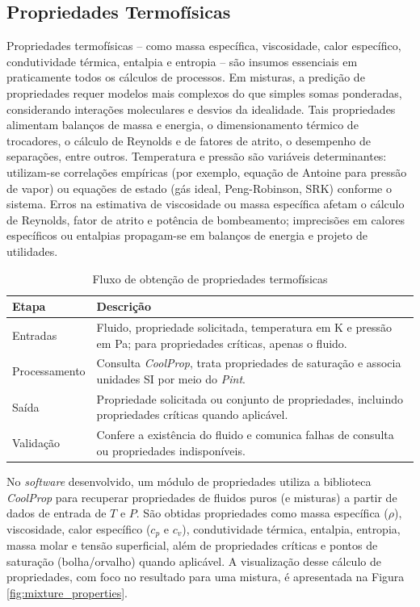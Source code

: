 \subsection{Propriedades Termofísicas}

Propriedades termofísicas – como massa específica, viscosidade, calor específico, condutividade térmica, entalpia e entropia – são insumos essenciais em praticamente todos os cálculos de processos. Em misturas, a predição de propriedades requer modelos mais complexos do que simples somas ponderadas, considerando interações moleculares e desvios da idealidade. Tais propriedades alimentam balanços de massa e energia, o dimensionamento térmico de trocadores, o cálculo de Reynolds e de fatores de atrito, o desempenho de separações, entre outros. Temperatura e pressão são variáveis determinantes: utilizam-se correlações empíricas (por exemplo, equação de Antoine para pressão de vapor) ou equações de estado (gás ideal, Peng-Robinson, SRK) conforme o sistema. Erros na estimativa de viscosidade ou massa específica afetam o cálculo de Reynolds, fator de atrito e potência de bombeamento; imprecisões em calores específicos ou entalpias propagam-se em balanços de energia e projeto de utilidades.

\begin{table}[H]
    \centering
    \caption{Fluxo de obtenção de propriedades termofísicas}
    \label{tab:fluxo-propriedades-termofisicas}
    \small
    \begin{tabular}{p{}p{}}
        \hline
        \textbf{Etapa} & \textbf{Descrição} \\
        \hline
        Entradas & Fluido, propriedade solicitada, temperatura em K e pressão em Pa; para propriedades críticas, apenas o fluido. \\
        Processamento & Consulta \textit{CoolProp}, trata propriedades de saturação e associa unidades SI por meio do \textit{Pint}. \\
        Saída & Propriedade solicitada ou conjunto de propriedades, incluindo propriedades críticas quando aplicável. \\
        Validação & Confere a existência do fluido e comunica falhas de consulta ou propriedades indisponíveis. \\
        \hline
    \end{tabular}
\end{table}

No \textit{software} desenvolvido, um módulo de propriedades utiliza a biblioteca \textit{CoolProp} para recuperar propriedades de fluidos puros (e misturas) a partir de dados de entrada de $T$ e $P$. São obtidas propriedades como massa específica ($\rho$), viscosidade, calor específico ($c_{p}$ e $c_{v}$), condutividade térmica, entalpia, entropia, massa molar e tensão superficial, além de propriedades críticas e pontos de saturação (bolha/orvalho) quando aplicável. A visualização desse cálculo de propriedades, com foco no resultado para uma mistura, é apresentada na Figura \ref{fig:mixture_properties}.

